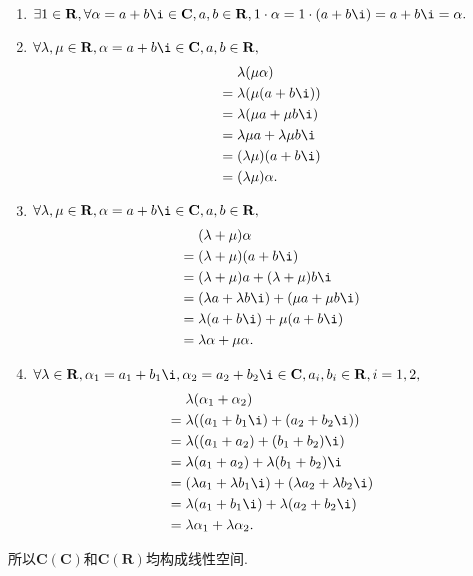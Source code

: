 \begin{solution}
\begin{enumerate}
                \begin{enumerate}
                    \item $\exists 1 \in \mathbf{R}, \forall \alpha = a+b\i \in \mathbf{C}, a, b \in \mathbf{R}, 1 \cdot \alpha = 1 \cdot (a+b\i) = a+b\i = \alpha.$

                    \item $\forall \lambda, \mu \in \mathbf{R}, \alpha = a+b\i \in \mathbf{C}, a, b \in \mathbf{R},$
                    \begin{align*}
                        & \lambda(\mu \alpha) \\ ={} & \lambda(\mu (a+b\i)) \\ ={} & \lambda(\mu a+\mu b\i) \\ ={} & \lambda \mu a + \lambda \mu b\i \\ ={} & (\lambda \mu)(a+b\i) \\ ={} & (\lambda \mu)\alpha.
                    \end{align*}

                    \item $\forall \lambda, \mu \in \mathbf{R}, \alpha = a+b\i \in \mathbf{C}, a, b \in \mathbf{R},$
                    \begin{align*}
                        & (\lambda + \mu) \alpha \\ ={} & (\lambda + \mu) (a+b\i) \\ ={} & (\lambda + \mu) a+(\lambda + \mu) b\i \\ ={} & (\lambda a + \lambda b\i) + (\mu a + \mu b\i) \\ ={} & \lambda(a+b\i)+\mu(a+b\i) \\ ={} & \lambda \alpha + \mu \alpha.
                    \end{align*}

                    \item $\forall \lambda \in \mathbf{R}, \alpha_1 = a_1+b_1\i, \alpha_2 = a_2+b_2\i \in \mathbf{C}, a_i, b_i \in \mathbf{R}, i = 1, 2,$
                    \begin{align*}
                        & \lambda(\alpha_1+\alpha_2) \\ ={} & \lambda((a_1+b_1\i)+(a_2+b_2\i)) \\ ={} & \lambda((a_1+a_2)+(b_1+b_2)\i) \\ ={} & \lambda(a_1+a_2)+\lambda(b_1+b_2)\i \\ ={} & (\lambda a_1+\lambda b_1\i)+(\lambda a_2+\lambda b_2\i) \\ ={} & \lambda(a_1+b_1\i)+\lambda(a_2+b_2\i) \\ ={} & \lambda \alpha_1 + \lambda \alpha_2.
                    \end{align*}
                \end{enumerate}
                所以$\mathbf{C}(\mathbf{C})$和$\mathbf{C}(\mathbf{R})$均构成线性空间.


\end{enumerate}
\end{solution}
